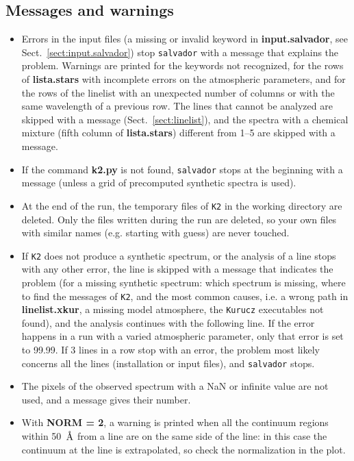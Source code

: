 \documentclass[modern]{aastex701}
\newcommand{\angstrom}{\mbox{\normalfont\AA}}
\begin{document}
\subsection{Messages and warnings}
\begin{itemize}
    \item Errors in the input files (a missing or invalid keyword in {\bf input.salvador}, see Sect.~\ref{sect:input.salvador}) stop \texttt{salvador} with a message that explains the problem. Warnings are printed for the keywords not recognized, for the rows of {\bf lista.stars} with incomplete errors on the atmospheric parameters, and for the rows of the linelist with an unexpected number of columns or with the same wavelength of a previous row. The lines that cannot be analyzed are skipped with a message (Sect.~\ref{sect:linelist}), and the spectra with a chemical mixture (fifth column of {\bf lista.stars}) different from 1--5 are skipped with a message.
    \item If the command {\bf k2.py} is not found, \texttt{salvador} stops at the beginning with a message (unless a grid of precomputed synthetic spectra is used).
    \item At the end of the run, the temporary files of \texttt{K2} in the working directory are deleted. Only the files written during the run are deleted, so your own files with similar names (e.g. starting with guess) are never touched.
    \item If \texttt{K2} does not produce a synthetic spectrum, or the analysis of a line stops with any other error, the line is skipped with a message that indicates the problem (for a missing synthetic spectrum: which spectrum is missing, where to find the messages of \texttt{K2}, and the most common causes, i.e. a wrong path in {\bf linelist.xkur}, a missing model atmosphere, the \texttt{Kurucz} executables not found), and the analysis continues with the following line. If the error happens in a run with a varied atmospheric parameter, only that error is set to 99.99. If 3 lines in a row stop with an error, the problem most likely concerns all the lines (installation or input files), and \texttt{salvador} stops.
    \item The pixels of the observed spectrum with a NaN or infinite value are not used, and a message gives their number.
    \item With {\bf NORM = 2}, a warning is printed when all the continuum regions within 50~$\angstrom$ from a line are on the same side of the line: in this case the continuum at the line is extrapolated, so check the normalization in the plot.

\end{itemize}
\end{document}
